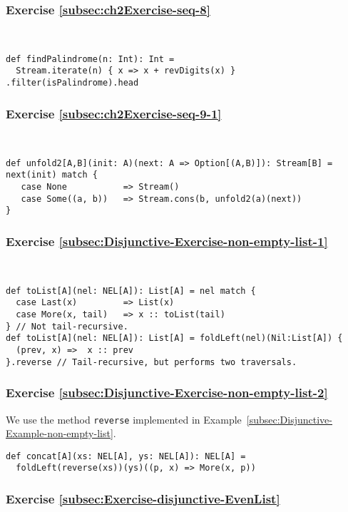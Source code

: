 \subsubsection*{Exercise \ref{subsec:ch2Exercise-seq-8}}

~
\begin{lstlisting}
def findPalindrome(n: Int): Int = 
  Stream.iterate(n) { x => x + revDigits(x) } .filter(isPalindrome).head
\end{lstlisting}


\subsubsection*{Exercise \ref{subsec:ch2Exercise-seq-9-1}}

~
\begin{lstlisting}
def unfold2[A,B](init: A)(next: A => Option[(A,B)]): Stream[B] = next(init) match {
   case None           => Stream()
   case Some((a, b))   => Stream.cons(b, unfold2(a)(next))
}
\end{lstlisting}



\subsubsection*{Exercise \ref{subsec:Disjunctive-Exercise-non-empty-list-1}}

~
\begin{lstlisting}
def toList[A](nel: NEL[A]): List[A] = nel match {
  case Last(x)         => List(x)
  case More(x, tail)   => x :: toList(tail)
} // Not tail-recursive.
def toList[A](nel: NEL[A]): List[A] = foldLeft(nel)(Nil:List[A]) {
  (prev, x) =>  x :: prev
}.reverse // Tail-recursive, but performs two traversals.
\end{lstlisting}


\subsubsection*{Exercise \ref{subsec:Disjunctive-Exercise-non-empty-list-2}}

We use the method \lstinline!reverse! implemented in Example~\ref{subsec:Disjunctive-Example-non-empty-list}.
\begin{lstlisting}
def concat[A](xs: NEL[A], ys: NEL[A]): NEL[A] =
  foldLeft(reverse(xs))(ys)((p, x) => More(x, p))
\end{lstlisting}


\subsubsection*{Exercise \ref{subsec:Exercise-disjunctive-EvenList}}

